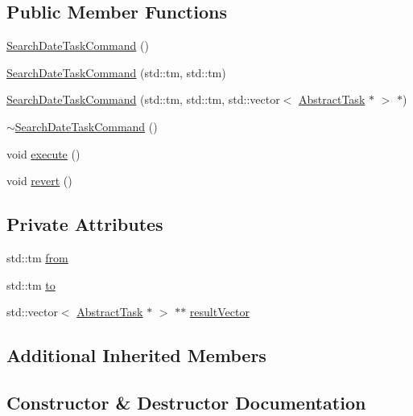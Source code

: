 \subsection*{Public Member Functions}
\begin{DoxyCompactItemize}
\item 
\hyperlink{class_do_lah_1_1_search_date_task_command_a034cad26e7938cbf5e208ac89def5727}{Search\+Date\+Task\+Command} ()
\item 
\hyperlink{class_do_lah_1_1_search_date_task_command_ad856497b490bf444dc136a02e7bf1ce6}{Search\+Date\+Task\+Command} (std\+::tm, std\+::tm)
\item 
\hyperlink{class_do_lah_1_1_search_date_task_command_afccfc83e0e836a331ff91ec9c6d23aae}{Search\+Date\+Task\+Command} (std\+::tm, std\+::tm, std\+::vector$<$ \hyperlink{class_do_lah_1_1_abstract_task}{Abstract\+Task} $\ast$ $>$ $\ast$)
\item 
\hyperlink{class_do_lah_1_1_search_date_task_command_abf18fe896967c8c039dad6a3f24c00b5}{$\sim$\+Search\+Date\+Task\+Command} ()
\item 
void \hyperlink{class_do_lah_1_1_search_date_task_command_ab20f0aa10b01a7b025c503c6794b3652}{execute} ()
\item 
void \hyperlink{class_do_lah_1_1_search_date_task_command_a33b164b407d2033550f94f0b156ed458}{revert} ()
\end{DoxyCompactItemize}
\subsection*{Private Attributes}
\begin{DoxyCompactItemize}
\item 
std\+::tm \hyperlink{class_do_lah_1_1_search_date_task_command_a62585e0d7ef68fac2faa30f36b05aca6}{from}
\item 
std\+::tm \hyperlink{class_do_lah_1_1_search_date_task_command_ad94dbdc014aaf1532c8ea2f829e6d034}{to}
\item 
std\+::vector$<$ \hyperlink{class_do_lah_1_1_abstract_task}{Abstract\+Task} $\ast$ $>$ $\ast$$\ast$ \hyperlink{class_do_lah_1_1_search_date_task_command_a060aa01ba9d63b26fa00f49287f2f594}{result\+Vector}
\end{DoxyCompactItemize}
\subsection*{Additional Inherited Members}


\subsection{Constructor \& Destructor Documentation}
\hypertarget{class_do_lah_1_1_search_date_task_command_a034cad26e7938cbf5e208ac89def5727}{}
